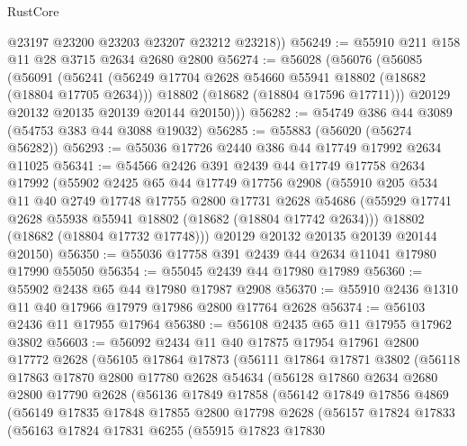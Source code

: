 \begin{lexlean}{RustCore}
\begin{coremodule}
        @23197
        @23200
        @23203
        @23207
        @23212
        @23218))
@56249 := @55910 @211 @158 @11 @28 @3715 @2634 @2680 @2800
@56274 := @56028
    (@56076
      (@56085
        (@56091
          (@56241
            (@56249 @17704 @2628 @54660 @55941 @18802 (@18682 (@18804 @17705 @2634)))
            @18802
            (@18682 (@18804 @17596 @17711)))
          @20129
          @20132
          @20135
          @20139
          @20144
          @20150)))
@56282 := @54749 @386 @44 @3089 (@54753 @383 @44 @3088 @19032)
@56285 := @55883 (@56020 (@56274 @56282))
@56293 := @55036 @17726 @2440 @386 @44 @17749 @17992 @2634 @11025
@56341 := @54566
    @2426
    @391
    @2439
    @44
    @17749
    @17758
    @2634
    @17992
    (@55902
      @2425
      @65
      @44
      @17749
      @17756
      @2908
      (@55910
        @205
        @534
        @11
        @40
        @2749
        @17748
        @17755
        @2800
        @17731
        @2628
        @54686
        (@55929 @17741 @2628 @55938 @55941 @18802 (@18682 (@18804 @17742 @2634)))
        @18802
        (@18682 (@18804 @17732 @17748)))
      @20129
      @20132
      @20135
      @20139
      @20144
      @20150)
@56350 := @55036 @17758 @391 @2439 @44 @2634 @11041 @17980 @17990 @55050
@56354 := @55045 @2439 @44 @17980 @17989
@56360 := @55902 @2438 @65 @44 @17980 @17987 @2908
@56370 := @55910 @2436 @1310 @11 @40 @17966 @17979 @17986 @2800 @17764 @2628
@56374 := @56103 @2436 @11 @17955 @17964
@56380 := @56108 @2435 @65 @11 @17955 @17962 @3802
@56603 := @56092
    @2434
    @11
    @40
    @17875
    @17954
    @17961
    @2800
    @17772
    @2628
    (@56105
      @17864
      @17873
      (@56111
        @17864
        @17871
        @3802
        (@56118
          @17863
          @17870
          @2800
          @17780
          @2628
          @54634
          (@56128
            @17860
            @2634
            @2680
            @2800
            @17790
            @2628
            (@56136
              @17849
              @17858
              (@56142
                @17849
                @17856
                @4869
                (@56149
                  @17835
                  @17848
                  @17855
                  @2800
                  @17798
                  @2628
                  (@56157
                    @17824
                    @17833
                    (@56163
                      @17824
                      @17831
                      @6255
                      (@55915
                        @17823
                        @17830

\end{coremodule}
\end{lexlean}
